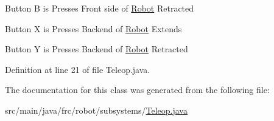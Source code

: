 Button B is Presses Front side of \hyperlink{classfrc_1_1robot_1_1Robot}{Robot} Retracted

Button X is Presses Backend of \hyperlink{classfrc_1_1robot_1_1Robot}{Robot} Extends

Button Y is Presses Backend of \hyperlink{classfrc_1_1robot_1_1Robot}{Robot} Retracted 

Definition at line 21 of file Teleop.\+java.



The documentation for this class was generated from the following file\+:\begin{DoxyCompactItemize}
\item 
src/main/java/frc/robot/subsystems/\hyperlink{Teleop_8java}{Teleop.\+java}\end{DoxyCompactItemize}
